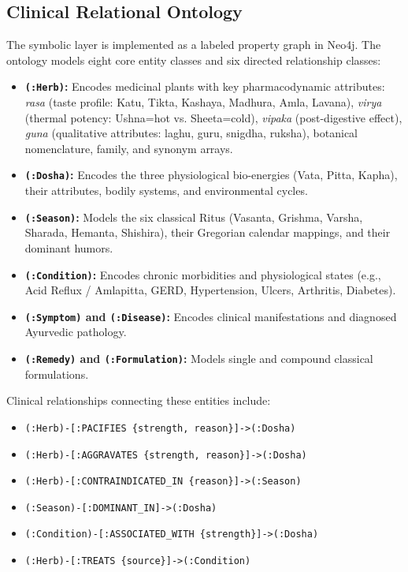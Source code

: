 \subsection{Clinical Relational Ontology}
The symbolic layer is implemented as a labeled property graph in Neo4j. The ontology models eight core entity classes and six directed relationship classes:

\begin{itemize}
    \item \textbf{\texttt{(:Herb)}:} Encodes medicinal plants with key pharmacodynamic attributes: \textit{rasa} (taste profile: Katu, Tikta, Kashaya, Madhura, Amla, Lavana), \textit{virya} (thermal potency: Ushna=hot vs. Sheeta=cold), \textit{vipaka} (post-digestive effect), \textit{guna} (qualitative attributes: laghu, guru, snigdha, ruksha), botanical nomenclature, family, and synonym arrays.
    \item \textbf{\texttt{(:Dosha)}:} Encodes the three physiological bio-energies (Vata, Pitta, Kapha), their attributes, bodily systems, and environmental cycles.
    \item \textbf{\texttt{(:Season)}:} Models the six classical Ritus (Vasanta, Grishma, Varsha, Sharada, Hemanta, Shishira), their Gregorian calendar mappings, and their dominant humors.
    \item \textbf{\texttt{(:Condition)}:} Encodes chronic morbidities and physiological states (e.g., Acid Reflux / Amlapitta, GERD, Hypertension, Ulcers, Arthritis, Diabetes).
    \item \textbf{\texttt{(:Symptom)} and \texttt{(:Disease)}:} Encodes clinical manifestations and diagnosed Ayurvedic pathology.
    \item \textbf{\texttt{(:Remedy)} and \texttt{(:Formulation)}:} Models single and compound classical formulations.
\end{itemize}

Clinical relationships connecting these entities include:
\begin{itemize}
    \item \texttt{(:Herb)-[:PACIFIES \{strength, reason\}]->(:Dosha)}
    \item \texttt{(:Herb)-[:AGGRAVATES \{strength, reason\}]->(:Dosha)}
    \item \texttt{(:Herb)-[:CONTRAINDICATED\_IN \{reason\}]->(:Season)}
    \item \texttt{(:Season)-[:DOMINANT\_IN]->(:Dosha)}
    \item \texttt{(:Condition)-[:ASSOCIATED\_WITH \{strength\}]->(:Dosha)}
    \item \texttt{(:Herb)-[:TREATS \{source\}]->(:Condition)}
\end{itemize}

